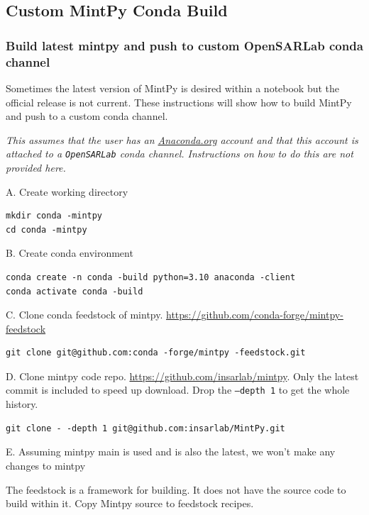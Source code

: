 \subsection{Custom MintPy Conda Build}

\subsubsection{Build latest mintpy and push to custom OpenSARLab conda channel}

Sometimes the latest version of MintPy is desired within a notebook but the official release is not current. These instructions will show how to build MintPy and push to a custom conda channel.

\textit{This assumes that the user has an \href{http://Anaconda.org}{Anaconda.org} account and that this account is attached to a \texttt{OpenSARLab} conda channel. Instructions on how to do this are not provided here.}

A. Create working directory

\begin{verbatim}
mkdir conda -mintpy
cd conda -mintpy
\end{verbatim}

B. Create conda environment

\begin{verbatim}
conda create -n conda -build python=3.10 anaconda -client
conda activate conda -build
\end{verbatim}

C. Clone conda feedstock of mintpy. \href{https://github.com/conda-forge/mintpy-feedstock}{https://github.com/conda-forge/mintpy-feedstock}

\begin{verbatim}
git clone git@github.com:conda -forge/mintpy -feedstock.git
\end{verbatim}

D. Clone mintpy code repo. \href{https://github.com/insarlab/mintpy}{https://github.com/insarlab/mintpy}. Only the latest commit is included to speed up download. Drop the \texttt{--depth 1} to get the whole history.

\begin{verbatim}
git clone - -depth 1 git@github.com:insarlab/MintPy.git
\end{verbatim}

E. Assuming mintpy main is used and is also the latest, we won't make any changes to mintpy

The feedstock is a framework for building. It does not have the source code to build within it. Copy Mintpy source to feedstock recipes.

